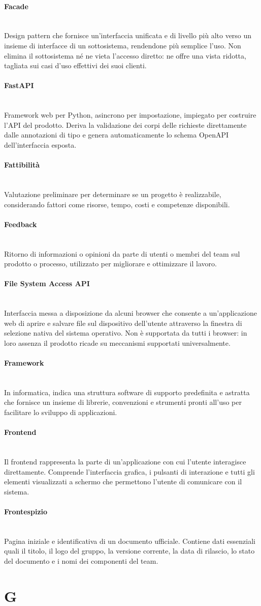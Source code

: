 \documentclass[a4paper, 10pt, colorlinks=true, linkcolor=black, urlcolor=blue, citecolor=blue, hidelinks]{article}
\newcommand{\glossaryterm}[2]{
    \paragraph{#1 \label{term:#1}} \mbox{} \\
    #2
    \vspace{0.5em}
}
\begin{document}
\glossaryterm{Facade}{Design pattern che fornisce un'interfaccia unificata e di livello più alto verso un insieme di interfacce di un sottosistema, rendendone più semplice l'uso. Non elimina il sottosistema né ne vieta l'accesso diretto: ne offre una vista ridotta, tagliata sui casi d'uso effettivi dei suoi clienti.}

\glossaryterm{FastAPI}{Framework web per Python, asincrono per impostazione, impiegato per costruire l'API del prodotto. Deriva la validazione dei corpi delle richieste direttamente dalle annotazioni di tipo e genera automaticamente lo schema OpenAPI dell'interfaccia esposta.}

\glossaryterm{Fattibilità}{Valutazione preliminare per determinare se un progetto è realizzabile, considerando fattori come risorse, tempo, costi e competenze disponibili.}

\glossaryterm{Feedback}{Ritorno di informazioni o opinioni da parte di utenti o membri del team sul prodotto o processo, utilizzato per migliorare e ottimizzare il lavoro.}

\glossaryterm{File System Access API}{Interfaccia messa a disposizione da alcuni browser che consente a un'applicazione web di aprire e salvare file sul dispositivo dell'utente attraverso la finestra di selezione nativa del sistema operativo. Non è supportata da tutti i browser: in loro assenza il prodotto ricade su meccanismi supportati universalmente.}

\glossaryterm{Framework}{In informatica, indica una struttura software di supporto predefinita e astratta che fornisce un insieme di librerie, convenzioni e strumenti pronti all'uso per facilitare lo sviluppo di applicazioni.}

\glossaryterm{Frontend}{Il frontend rappresenta la parte di un'applicazione con cui l'utente interagisce direttamente. Comprende l'interfaccia grafica, i pulsanti di interazione e tutti gli elementi visualizzati a schermo che permettono l'utente di comunicare con il sistema.}

\glossaryterm{Frontespizio}{Pagina iniziale e identificativa di un documento ufficiale. Contiene dati essenziali quali il titolo, il logo del gruppo, la versione corrente, la data di rilascio, lo stato del documento e i nomi dei componenti del team.}

\newpage

\section*{G}
\end{document}
